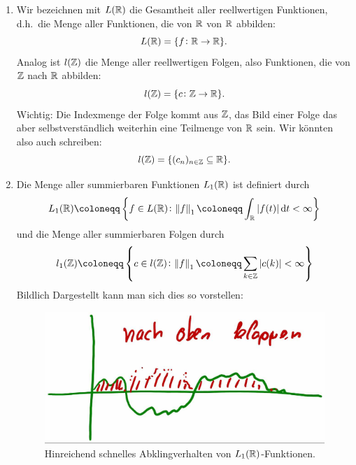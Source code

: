 \begin{definition}[Funktionenräume] \leavevmode
\begin{enumerate}
\item Wir bezeichnen mit $ L(\mathbb{R}) $ die Gesamtheit aller reellwertigen Funktionen, d.h.\ die Menge 
  aller Funktionen, die von $ \mathbb{R} $ von $ \mathbb{R} $ abbilden:
  \[
    L(\mathbb{R}) = \{ f \colon \mathbb{R} \rightarrow \mathbb{R} \}.
  \]
  Analog ist $ l(\mathbb{Z}) $ die Menge aller reellwertigen Folgen, also Funktionen, die von $ \mathbb{Z} $ nach
  $ \mathbb{R} $ abbilden:
  \[
    l(\mathbb{Z}) = \{ c \colon \mathbb{Z} \rightarrow \mathbb{R} \}.
  \]
  Wichtig: Die Indexmenge der Folge kommt aus $ \mathbb{Z} $, das Bild einer Folge das aber 
  selbstverständlich weiterhin eine Teilmenge von $ \mathbb{R} $ sein. Wir könnten also auch schreiben:
  \[
    l(\mathbb{Z}) = \{ (c_{n})_{n \in \mathbb{Z}} \subseteq \mathbb{R} \}.
  \]
\item Die Menge aller summierbaren Funktionen $ L_{1}(\mathbb{R}) $ ist definiert durch
\[ 
  L_{1}(\R) \coloneqq \left\{
    f \in L(\R) \colon \norm{f}_{1} \coloneqq \int_{\R} |f(t)| \dif t < \infty
  \right\}
\]
und die Menge aller summierbaren Folgen durch
\[ 
  l_{1}(\Z) \coloneqq \left\{
    c \in l(\Z) \colon \norm{f}_{1} \coloneqq \sum_{k \in \Z} |c(k)| < \infty
  \right\}
\]
Bildlich Dargestellt kann man sich dies so vorstellen:
\begin{figure}[h]
\centering
\includegraphics[width=0.5\linewidth]{Bilder/L1}
\caption{Hinreichend schnelles Abklingverhalten von $ L_{1}(\mathbb{R}) $-Funktionen.}
\label{fig:L1}
\end{figure}





\end{enumerate}
\end{definition}

